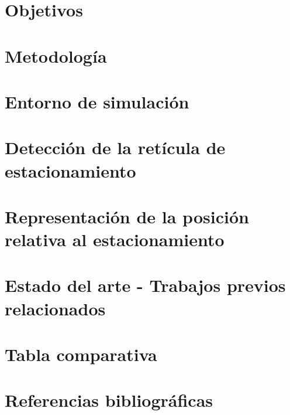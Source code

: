 \documentclass[10pt,letterpaper,final]{article}
\newlength{\spacing}
\newcommand{\nspace}[1]{\setlength{\baselineskip}{#1\spacing}}
\newenvironment{linespacing}[1]{\nspace{#1}}{}
\begin{document}
\begin{linespacing}{1.5}
    \section*{Objetivos}
    
    \clearpage

    \section*{Metodología}
    \justify
    



    \section*{Entorno de simulación}
    
    \clearpage

    \section*{Detección de la retícula de estacionamiento}
    
    \clearpage


    \section*{Representación de la posición relativa al estacionamiento}
    
    \clearpage


%    

    \section*{Estado del arte - Trabajos previos relacionados}
    

    \section*{Tabla comparativa}
    
    \clearpage

\end{linespacing}

    \section*{Referencias bibliográficas}
    
    
\end{document}
